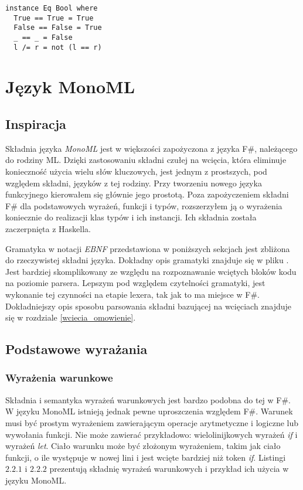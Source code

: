 \documentclass[declaration,shortabstract]{iithesis}
\begin{document}
\begin{lstlisting}[frame=lines]
instance Eq Bool where
  True == True = True 
  False == False = True 
  _ == _ = False
  l /= r = not (l == r)
\end{lstlisting}

\chapter{Język MonoML}

\section{Inspiracja}
Składnia języka \textit{MonoML} jest w większości zapożyczona z języka F\#, należącego
do rodziny ML. Dzięki zastosowaniu składni czułej na wcięcia, która eliminuje 
konieczność użycia wielu słów kluczowych, jest jednym z prostszych, pod względem 
składni, języków z tej rodziny. Przy tworzeniu nowego języka funkcyjnego kierowałem się głównie 
jego prostotą. Poza zapożyczeniem składni F\# dla podstawowych wyrażeń,
funkcji i typów, rozszerzyłem ją o wyrażenia koniecznie do realizacji klas 
typów i ich instancji. Ich składnia została zaczerpnięta z Haskella.

Gramatyka w notacji \textit{EBNF} przedstawiona w poniższych sekcjach 
jest zbliżona do rzeczywistej składni języka.
Dokładny opis gramatyki znajduje się w pliku 
. Jest bardziej skomplikowany
ze względu na rozpoznawanie wciętych bloków kodu na
poziomie parsera. Lepszym pod względem czytelności gramatyki, 
jest wykonanie tej czynności na etapie lexera, tak jak to ma miejsce w F\#.
Dokładniejszy opis 
sposobu parsowania składni bazującej na wcięciach znajduje się w rozdziale 
\ref{wciecia_omowienie}. 

\section{Podstawowe wyrażania}

\subsection{Wyrażenia warunkowe}

Składnia i semantyka wyrażeń warunkowych jest bardzo podobna do tej w F\#. W 
języku MonoML
istnieją jednak pewne uproszczenia względem F\#. 
Warunek musi być prostym wyrażeniem zawierającym operacje arytmetyczne i 
logiczne lub wywołania funkcji. Nie może zawierać przykładowo:
wielolinijkowych wyrażeń \textit{if} i wyrażeń \textit{let}. 
Ciało warunku może być złożonym wyrażeniem, takim jak 
ciało funkcji, o ile występuje w nowej lini i jest wcięte bardziej niż 
token \textit{if}. Listingi $2.2.1$ i $2.2.2$ prezentują składnię wyrażeń 
warunkowych i przykład ich użycia w języku MonoML.
\end{document}

